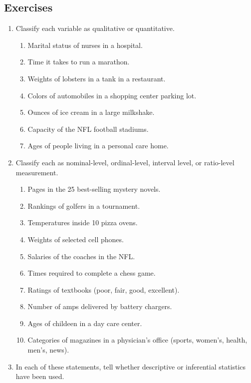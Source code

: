 \documentclass{article}
\begin{document}
\subsection{Exercises}

\begin{enumerate}
    \item Classify each variable as qualitative or quantitative.
    \begin{enumerate}
        \item Marital status of nurses in a hospital.
        \item Time it takes to run a marathon.
        \item Weights of lobsters in a tank in a restaurant.
        \item Colors of automobiles in a shopping center parking lot.
        \item Ounces of ice cream in a large milkshake.
        \item Capacity of the NFL football stadiums.
        \item Ages of people living in a personal care home.
    \end{enumerate}
    \item Classify each as nominal-level, ordinal-level, interval level, or ratio-level measurement.
    \begin{enumerate}
        \item Pages in the 25 best-selling mystery novels.
        \item Rankings of golfers in a tournament.
        \item Temperatures inside 10 pizza ovens.
        \item Weights of selected cell phones.
        \item Salaries of the coaches in the NFL.
        \item Times required to complete a chess game.
        \item Ratings of textbooks (poor, fair, good, excellent).
        \item Number of amps delivered by battery chargers.
        \item Ages of childeen in a day care center.
        \item Categories of magazines in a physician’s office (sports, women’s, health, men’s, news).
    \end{enumerate}
    \item In each of these statements, tell whether descriptive or inferential statistics have been used.
    \begin{enumerate}

\end{enumerate}
\end{enumerate}
\end{document}

